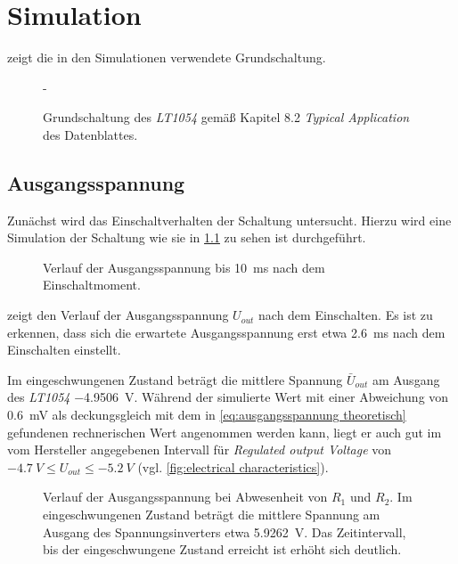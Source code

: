 \chapter{Simulation}
	 zeigt die in den Simulationen verwendete Grundschaltung.
	\begin{figure}[h]
		\centering
		
		\caption[Grundschaltung des \textit{LT1054}]{Grundschaltung des \textit{LT1054} gemäß Kapitel 8.2 \textit{Typical Application} des Datenblattes.}-
		\label{fig:grundschaltung}
	\end{figure}
	\newpage
	\section{Ausgangsspannung}
		Zunächst wird das Einschaltverhalten der Schaltung untersucht. Hierzu wird eine Simulation der Schaltung wie sie in \cref{fig:grundschaltung}
		zu sehen ist durchgeführt.
		\begin{figure}[h]
			\centering
			
			\caption[Verlauf der Ausgangsspannung nach dem Einschaltmoment]{Verlauf der Ausgangsspannung bis \SI{10}{ms} nach dem Einschaltmoment.}
			\label{fig:Ausgangsspannung nach dem einschalten}
		\end{figure}
		 zeigt den Verlauf der Ausgangsspannung \(U_{out}\) nach dem Einschalten.
		Es ist zu erkennen, dass sich die erwartete Ausgangsspannung erst etwa \SI{2,6}{ms} nach dem Einschalten einstellt.\par
		Im eingeschwungenen Zustand beträgt die mittlere Spannung \(\bar{U}_{out}\) am Ausgang des \textit{LT1054} \SI{-4,9506}{V}.
		Während der simulierte Wert mit einer Abweichung von \SI{0,6}{mV} als deckungsgleich mit dem in \cref{eq:ausgangsspannung theoretisch} gefundenen rechnerischen
		Wert angenommen werden kann, liegt er auch gut im vom Hersteller angegebenen Intervall für \textit{Regulated output Voltage}
		von \(\SI{-4,7}{V} \leq U_{out} \leq \SI{-5,2}{V}\) (vgl. \cref{fig:electrical characteristics}).\par\medskip
		\begin{figure}[h]
			\centering
			
			\caption[Verlauf der Ausgangsspannung bei Abwesenheit von \(R_1\) und \(R_2\)]{Verlauf der Ausgangsspannung bei Abwesenheit von \(R_1\) und \(R_2\). Im eingeschwungenen Zustand beträgt die mittlere
			Spannung am Ausgang des Spannungsinverters etwa \SI{5,9262}{V}. Das Zeitintervall, bis der eingeschwungene Zustand erreicht ist erhöht sich deutlich.}
			\label{fig:ohne regelung}
		\end{figure}
